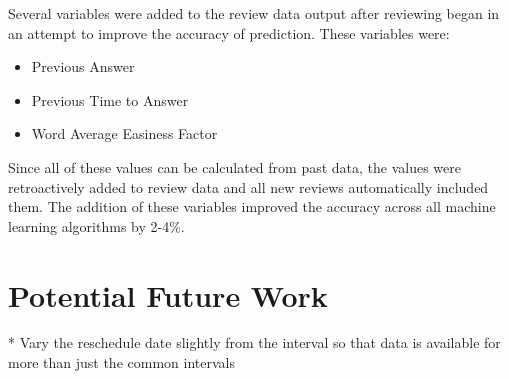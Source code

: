Several variables were added to the review data output after reviewing began in an
attempt to improve the accuracy of prediction. These
variables were:
\begin{itemize}
  \item Previous Answer
  \item Previous Time to Answer
  \item Word Average Easiness Factor
\end{itemize}

Since all of these values can be calculated from past data, the values were
retroactively added to review data and all new reviews automatically included them.
The addition of these variables improved the accuracy across all machine learning 
algorithms by 2-4\%.

\section{Potential Future Work}
* Vary the reschedule date slightly from the interval so that data is available for more
than just the common intervals